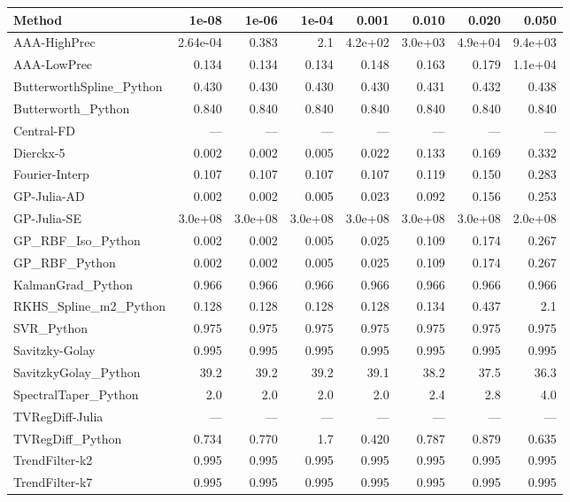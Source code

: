 \documentclass[10pt]{article}
\begin{document}
\begin{longtable}{lrrrrrrr}
\toprule
\textbf{Method} & \textbf{1e-08} & \textbf{1e-06} & \textbf{1e-04} & \textbf{0.001} & \textbf{0.010} & \textbf{0.020} & \textbf{0.050} \\
\midrule
\endhead
AAA-HighPrec & 2.64e-04 & 0.383 & 2.1 & 4.2e+02 & 3.0e+03 & 4.9e+04 & 9.4e+03 \\
AAA-LowPrec & 0.134 & 0.134 & 0.134 & 0.148 & 0.163 & 0.179 & 1.1e+04 \\
ButterworthSpline\_Python & 0.430 & 0.430 & 0.430 & 0.430 & 0.431 & 0.432 & 0.438 \\
Butterworth\_Python & 0.840 & 0.840 & 0.840 & 0.840 & 0.840 & 0.840 & 0.840 \\
Central-FD & --- & --- & --- & --- & --- & --- & --- \\
Dierckx-5 & 0.002 & 0.002 & 0.005 & 0.022 & 0.133 & 0.169 & 0.332 \\
Fourier-Interp & 0.107 & 0.107 & 0.107 & 0.107 & 0.119 & 0.150 & 0.283 \\
GP-Julia-AD & 0.002 & 0.002 & 0.005 & 0.023 & 0.092 & 0.156 & 0.253 \\
GP-Julia-SE & 3.0e+08 & 3.0e+08 & 3.0e+08 & 3.0e+08 & 3.0e+08 & 3.0e+08 & 2.0e+08 \\
GP\_RBF\_Iso\_Python & 0.002 & 0.002 & 0.005 & 0.025 & 0.109 & 0.174 & 0.267 \\
GP\_RBF\_Python & 0.002 & 0.002 & 0.005 & 0.025 & 0.109 & 0.174 & 0.267 \\
KalmanGrad\_Python & 0.966 & 0.966 & 0.966 & 0.966 & 0.966 & 0.966 & 0.966 \\
RKHS\_Spline\_m2\_Python & 0.128 & 0.128 & 0.128 & 0.128 & 0.134 & 0.437 & 2.1 \\
SVR\_Python & 0.975 & 0.975 & 0.975 & 0.975 & 0.975 & 0.975 & 0.975 \\
Savitzky-Golay & 0.995 & 0.995 & 0.995 & 0.995 & 0.995 & 0.995 & 0.995 \\
SavitzkyGolay\_Python & 39.2 & 39.2 & 39.2 & 39.1 & 38.2 & 37.5 & 36.3 \\
SpectralTaper\_Python & 2.0 & 2.0 & 2.0 & 2.0 & 2.4 & 2.8 & 4.0 \\
TVRegDiff-Julia & --- & --- & --- & --- & --- & --- & --- \\
TVRegDiff\_Python & 0.734 & 0.770 & 1.7 & 0.420 & 0.787 & 0.879 & 0.635 \\
TrendFilter-k2 & 0.995 & 0.995 & 0.995 & 0.995 & 0.995 & 0.995 & 0.995 \\
TrendFilter-k7 & 0.995 & 0.995 & 0.995 & 0.995 & 0.995 & 0.995 & 0.995 \\

\end{longtable}
\end{document}
